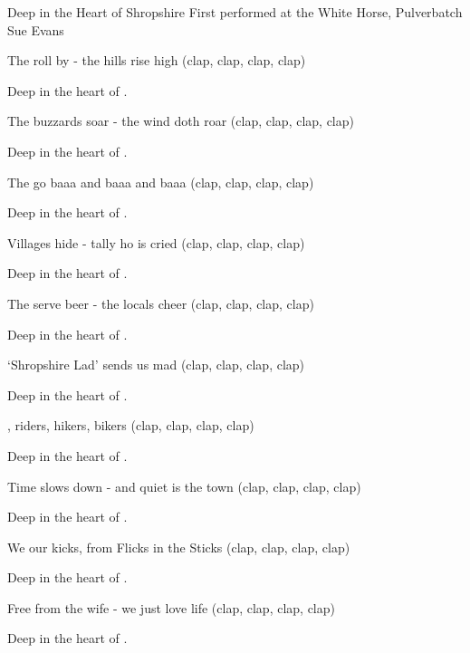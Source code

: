\begin{SBSong}{Deep in the Heart of Shropshire}
  {First performed at the White Horse, Pulverbatch}
  {Sue Evans}
  \begin{SBVerse}
    The  roll by - the hills rise high (clap, clap, clap, clap)
    
    Deep in the heart of . 
            
    The buzzards soar - the wind doth roar (clap, clap, clap, clap)
    
    Deep in the heart of . 
  \end{SBVerse}
  \begin{SBVerse}
    The  go baaa and baaa and baaa (clap, clap, clap, clap)
    
    Deep in the heart of . 
    
    Villages hide - tally ho is cried (clap, clap, clap, clap)
    
    Deep in the heart of . 
  \end{SBVerse}
  \begin{SBVerse}
    The  serve beer - the locals cheer (clap, clap, clap, clap)
    
    Deep in the heart of . 

    `Shropshire Lad' sends us mad (clap, clap, clap, clap)
    
    Deep in the heart of . 
  \end{SBVerse}
  \begin{SBVerse}
    , riders, hikers, bikers (clap, clap, clap, clap)
    
    Deep in the heart of . 
    
    Time slows down - and quiet is the town (clap, clap, clap, clap)
    
    Deep in the heart of . 
  \end{SBVerse}
  \begin{SBVerse}
    We  our kicks, from Flicks in the Sticks (clap, clap, clap, clap)
    
    Deep in the heart of . 
    
    Free from the wife - we just love life (clap, clap, clap, clap)
    
    Deep in the heart of . 
  \end{SBVerse}
\end{SBSong}
